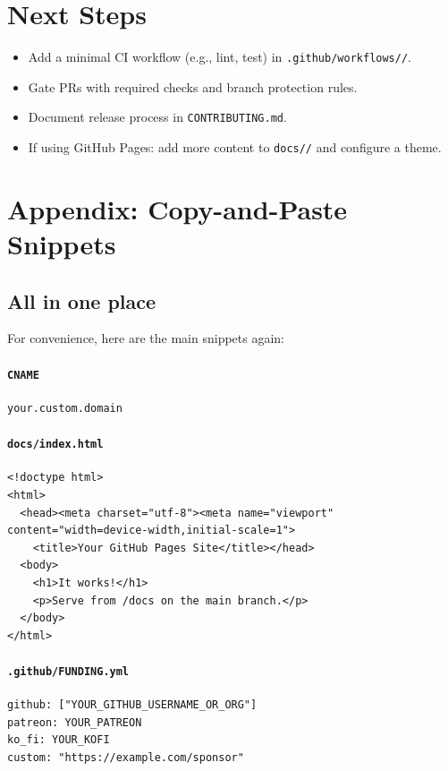 \documentclass[11pt]{article}
\newcommand{\file}[1]{\texttt{#1}}
\newcommand{\dir}[1]{\texttt{#1/}}
\begin{document}
\section{Next Steps}
\begin{itemize}
  \item Add a minimal CI workflow (e.g., lint, test) in \dir{.github/workflows/}.
  \item Gate PRs with required checks and branch protection rules.
  \item Document release process in \file{CONTRIBUTING.md}.
  \item If using GitHub Pages: add more content to \dir{docs/} and configure a theme.
\end{itemize}

\section*{Appendix: Copy-and-Paste Snippets}
\subsection*{All in one place}
For convenience, here are the main snippets again:

\paragraph{\file{CNAME}}
\begin{verbatim}
your.custom.domain
\end{verbatim}

\paragraph{\file{docs/index.html}}
\begin{verbatim}
<!doctype html>
<html>
  <head><meta charset="utf-8"><meta name="viewport" content="width=device-width,initial-scale=1">
    <title>Your GitHub Pages Site</title></head>
  <body>
    <h1>It works!</h1>
    <p>Serve from /docs on the main branch.</p>
  </body>
</html>
\end{verbatim}

\paragraph{\file{.github/FUNDING.yml}}
\begin{verbatim}
github: ["YOUR_GITHUB_USERNAME_OR_ORG"]
patreon: YOUR_PATREON
ko_fi: YOUR_KOFI
custom: "https://example.com/sponsor"
\end{verbatim}
\end{document}
